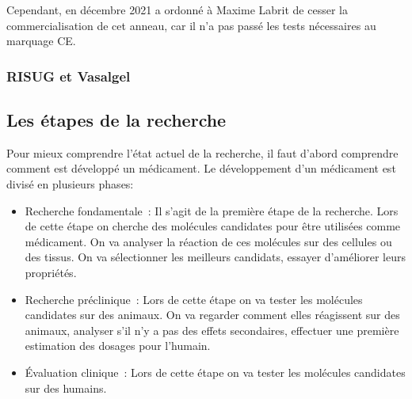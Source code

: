 \documentclass[12pt,a4paper]{report}
\begin{document}
Cependant, en décembre 2021 a ordonné à Maxime Labrit de cesser la commercialisation de cet anneau, car il n'a pas passé les tests nécessaires au marquage CE. \cite{ActualiteAnneauContraceptif}

\subsection{RISUG et Vasalgel}

\listoffigures


\begin{appendix}

    \chapter{Les étapes de la recherche} \label{annexe:etapes_recherche}

    Pour mieux comprendre l'état actuel de la recherche, il faut d'abord comprendre comment est développé un médicament.
Le développement d'un médicament est divisé en plusieurs phases: \cite{DeveloppementMedicamentInserm}

\begin{itemize}
    \item Recherche fondamentale : Il s'agit de la première étape de la recherche.
    Lors de cette étape on cherche des molécules candidates pour être utilisées comme médicament.
    On va analyser la réaction de ces molécules sur des cellules ou des tissus.
    On va sélectionner les meilleurs candidats, essayer d'améliorer leurs propriétés.

    \item Recherche préclinique : Lors de cette étape on va tester les molécules candidates sur des animaux.
    On va regarder comment elles réagissent sur des animaux, analyser s'il n'y a pas des effets secondaires, effectuer une première estimation des dosages pour l'humain.

    \item Évaluation clinique : Lors de cette étape on va tester les molécules candidates sur des humains.


\end{itemize}
\end{appendix}
\end{document}
